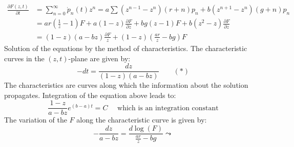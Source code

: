 \begin{align*}
	\frac{\partial F(z,t)}{\partial t}&=\sum\limits_{n=0}^\infty \dot{p}_n(t)z^n=a\sum \left(z^{n-1}-z^n\right)(r+n)p_n+b\left(z^{n+1}-z^n\right)(g+n)p_n\\
	&=ar(\frac{1}{z}-1)F+a(1-z)\frac{\partial F}{\partial z}+bg(z-1)F+b(z^2-z)\frac{\partial F}{\partial z}\\
	&=(1-z)(a-bz)\frac{\partial F}{z}+(1-z)\left(\frac{ar}{z}-bg\right)F
\end{align*}
Solution of the equations by the method of characteristics. The characteristic curves in the $(z,t)$-plane are given by:
\begin{equation*}
	-dt=\frac{dz}{(1-z)(a-bz)} \qquad (\ast)
\end{equation*}
The characteristics are curves along which the information about the solution propagates. Integration of the equation above leads to:
\begin{equation*}
	\frac{1-z}{a-bz}e^{(b-a)t}=C \quad\text{ which is an integration constant}
\end{equation*}
The variation of the $F$ along the characteristic curve is given by:
\begin{equation*}
	-\frac{dz}{a-bz}=\frac{d\log(F)}{\frac{ar}{z}-bg}\leadsto 
\end{equation*}
